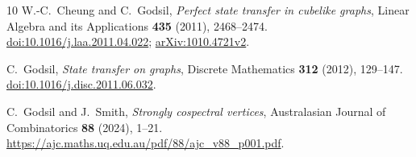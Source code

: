 \documentclass[11pt]{article}
\theoremstyle{definition}
\begin{document}
{\begin{thebibliography}{10}
W.-C.~Cheung and C.~Godsil,
\emph{Perfect state transfer in cubelike graphs},
Linear Algebra and its Applications \textbf{435} (2011), 2468--2474.
\href{https://doi.org/10.1016/j.laa.2011.04.022}{doi:10.1016/j.laa.2011.04.022};
\href{https://arxiv.org/abs/1010.4721v2}{arXiv:1010.4721v2}.

C.~Godsil, \emph{State transfer on graphs},
Discrete Mathematics \textbf{312} (2012), 129--147.
\href{https://doi.org/10.1016/j.disc.2011.06.032}{doi:10.1016/j.disc.2011.06.032}.

C.~Godsil and J.~Smith, \emph{Strongly cospectral vertices},
Australasian Journal of Combinatorics \textbf{88} (2024), 1--21.
\url{https://ajc.maths.uq.edu.au/pdf/88/ajc_v88_p001.pdf}.

\end{thebibliography}
}
\end{document}
